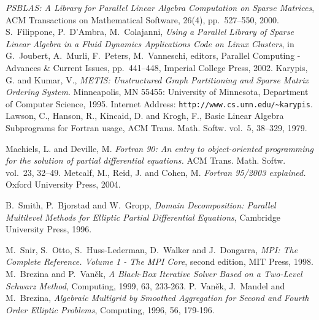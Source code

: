 \begin{thebibliography}{99}
{\em PSBLAS: A Library for Parallel Linear Algebra
Computation on Sparse Matrices},
\newblock
ACM Transactions on Mathematical Software, 26(4), pp.~527--550, 2000.
%
S.~Filippone, P.~D'Ambra, M.~Colajanni,
{\em Using a Parallel Library of Sparse Linear Algebra in a Fluid Dynamics 
Applications Code on Linux Clusters},
in G.~Joubert, A.~Murli, F.~Peters, M.~Vanneschi, editors,
Parallel Computing - Advances \& Current Issues,
pp.~441--448, Imperial College Press, 2002. 
%
Karypis, G. and Kumar, V.,
{\em {METIS}: Unstructured Graph Partitioning and Sparse Matrix
  Ordering System}.
Minneapolis, MN 55455: University of Minnesota, Department of
  Computer Science, 1995. 
Internet Address: {\verb|http://www.cs.umn.edu/~karypis|}.
Lawson, C.,  Hanson, R., Kincaid, D. and Krogh, F.,
   Basic {L}inear {A}lgebra {S}ubprograms for {F}ortran usage,
{ACM Trans. Math. Softw.} vol.~{5}, 38--329, 1979.

{Machiels, L. and Deville, M.}
{\em Fortran 90: An entry to object-oriented programming for the solution
  of partial differential equations.}
{ACM Trans. Math. Softw.} vol.~{23}, 32--49.
{Metcalf, M., Reid, J. and Cohen, M.}
{\em Fortran 95/2003 explained.}
{Oxford University Press}, 2004.

B.~Smith, P.~Bjorstad and W.~Gropp,
{\em Domain Decomposition: Parallel Multilevel Methods for Elliptic
Partial Differential Equations},
Cambridge University Press, 1996.

M.~Snir, S.~Otto, S.~Huss-Lederman, D.~Walker and J.~Dongarra,
{\em MPI: The Complete Reference. Volume 1 - The MPI Core}, second edition,
MIT Press, 1998.
%
M.~Brezina and P.~Van{\v e}k,
{\em A Black-Box Iterative Solver Based on a Two-Level Schwarz Method},
Computing, 1999, 63, 233-263.
%
%
P.~Van{\v e}k, J.~Mandel and M.~Brezina,
{\em Algebraic Multigrid by Smoothed Aggregation for Second and Fourth Order Elliptic Problems},
Computing, 1996, 56, 179-196.
%

\end{thebibliography}